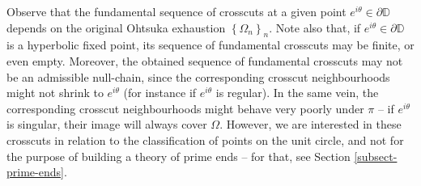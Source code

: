 \documentclass[11pt,a4paper,reqno]{amsart}
\theoremstyle{plain}
\theoremstyle{definition}
\theoremstyle{plain}
\def\DD{\mathbb{D}}
\begin{document}
Observe that the fundamental sequence of crosscuts  at a given point $ e^{i\theta}\in\partial\mathbb{D} $ depends on the original Ohtsuka exhaustion $ \left\lbrace \Omega_n\right\rbrace _n $.
Note also that, if $e^{i\theta}\in\partial\DD$ is a hyperbolic fixed point, its sequence of fundamental crosscuts may be finite, or even empty. Moreover, the obtained sequence of fundamental crosscuts may not be an admissible null-chain, since the corresponding crosscut neighbourhoods might not shrink to $e^{i\theta}$ (for instance if $e^{i\theta}$ is regular). In the same vein, the corresponding crosscut neighbourhoods might behave very poorly under $\pi$ -- if $e^{i\theta}$ is singular, their image will always cover $\Omega$. However, we are interested in these crosscuts in relation to the classification of points on the unit circle, and not for the purpose of building a theory of prime ends -- for that, see Section \ref{subsect-prime-ends}.
\end{document}
